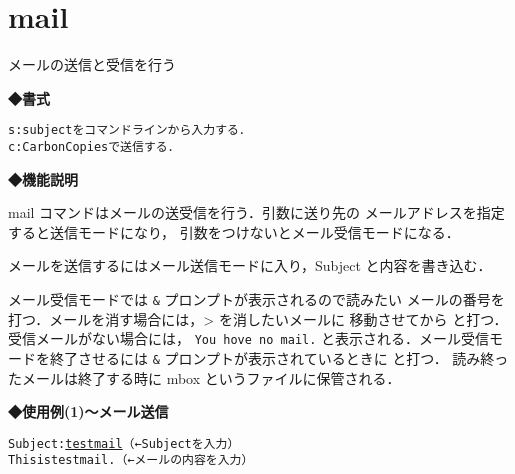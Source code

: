 
\section{mail}
メールの送信と受信を行う\par
\label{cmd:mail}
\noindent
{\bf ◆書式}
\begin{center}
\begin{screen}
\begin{alltt}
% mail [-s] [-c mailaccount] [アドレス]

    s: subjectをコマンドラインから入力する．
    c: Carbon Copiesで送信する．
\end{alltt}
\end{screen}
\end{center}

\noindent
{\bf ◆機能説明}

mail コマンドはメールの送受信を行う．引数に送り先の
メールアドレスを指定すると送信モードになり，
引数をつけないとメール受信モードになる．

メールを送信するにはメール送信モードに入り，Subject と内容を書き込む．

メール受信モードでは \texttt{\&} プロンプトが表示されるので読みたい
メールの番号を打つ．メールを消す場合には，{\textgreater} を消したいメールに
移動させてから  と打つ．受信メールがない場合には，
\texttt{You hove no mail.} と表示される．メール受信モードを終了させるには %
\texttt{\&} プロンプトが表示されているときに  と打つ．
読み終ったメールは終了する時に mbox というファイルに保管される．

{\bf ◆使用例(1)〜メール送信}
\begin{center}
\begin{breakbox}
\begin{alltt}
% \underline{mail xxx@ugs.kochi-tech.ac.jp} \keybox{Enter} （←メール送信の例）
Subject: \underline{test mail}   （←Subjectを入力）
This is test mail.  （←メールの内容を入力）

%
\end{alltt}
\end{breakbox}
\end{center}

